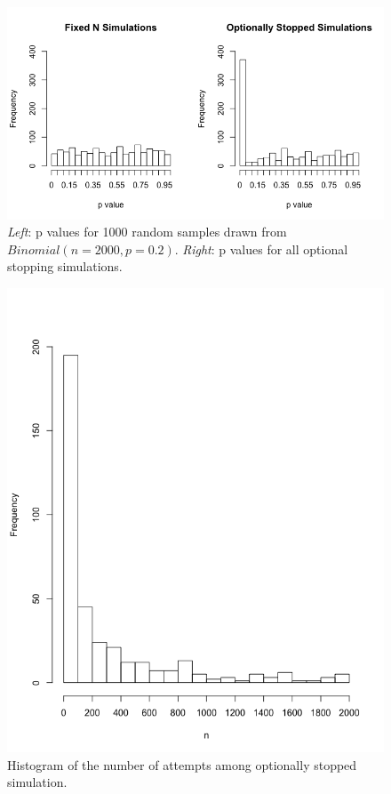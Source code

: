 \begin{figure}[h] 
\begin{center}
\includegraphics[scale=0.5]{fixedvsoptional.png}
	\caption{\emph{Left}: p values for 1000 random samples drawn from $Binomial(n=2000,p=0.2)$. \emph{Right}: p values for all optional stopping simulations.}
	\label{fig:freqfixedvsoptional}
\end{center}	
\end{figure}

\begin{figure}[h] 
\begin{center}
\includegraphics[scale=0.4]{freqstopn.png}
	\caption{Histogram of the number of attempts among optionally stopped simulation.}
	\label{fig:freqhistn}
\end{center}	
\end{figure}

